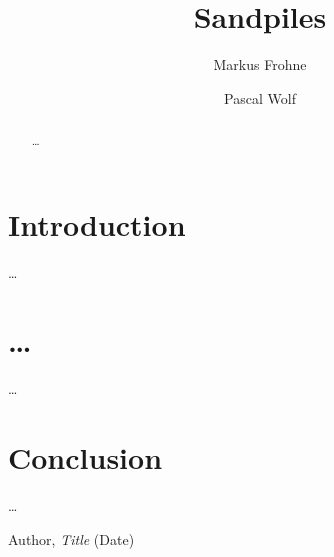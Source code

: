 \documentclass[a4paper,twocolumn]{revtex4-1}
\begin{document}
\title{Sandpiles}
\author{Markus Frohne}
\email{\dots}
\author{Pascal Wolf}
\email{\dots}


\begin{abstract}
\dots
\end{abstract}

\maketitle


\section{Introduction}
\dots


\section{\dots}
\dots
\begin{figure}[htb]
    \centering
    \caption{}
\end{figure}


\section{Conclusion}
\dots


\begin{thebibliography}{}
    \bibitem{}
    Author, \emph{Title} (Date)
\end{thebibliography}
\end{document}
